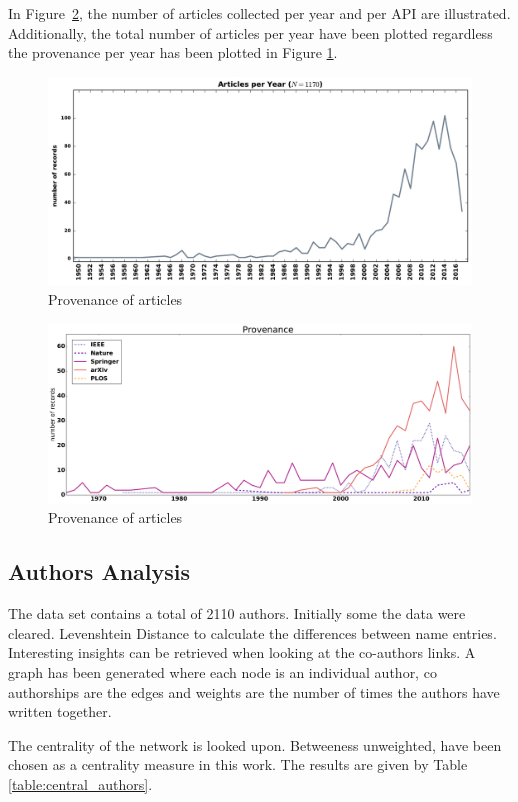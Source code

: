 \documentclass{article}
\begin{document}
In Figure~\ref{fig:provenance}, the number of articles collected per year and 
per API are illustrated. Additionally, the total number of articles per year
have been plotted regardless the provenance per year has been plotted in Figure
\ref{fig:timeline_no_points}.

\begin{figure}[!hbtp]
    \centering
    \includegraphics[width=.8\textwidth]{./assets/images/timeline_no_points.pdf}
    \caption{Provenance of articles}
    \label{fig:timeline_no_points}
\end{figure}

\begin{figure}[!hbtp]
    \centering
    \includegraphics[width=.8\textwidth]{./assets/images/provenance.pdf}
    \caption{Provenance of articles}
    \label{fig:provenance}
\end{figure}

\subsection{Authors Analysis}
The data set contains a total of 2110 authors. Initially some the data were cleared.
Levenshtein Distance to calculate the differences between name entries. 
Interesting insights can be retrieved when looking at the co-authors links.
A graph has been generated where each node is an individual author, 
co authorships are the edges and weights are the number of times the authors 
have written together. 

The centrality of the network is looked upon. Betweeness unweighted, have been 
chosen as a centrality measure in this work. The results are given by Table
\ref{table:central_authors}.
\end{document}
